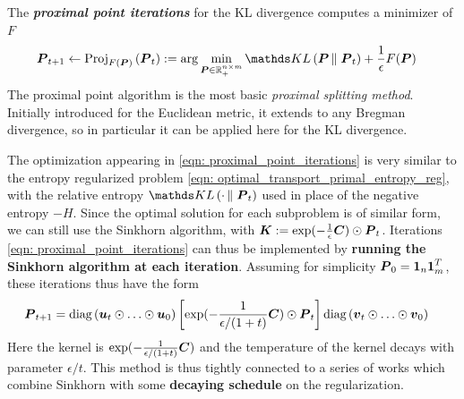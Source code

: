 \documentclass[11pt]{article}
\begin{document}
The \textbf{\emph{proximal point iterations}} for the KL divergence computes a minimizer of $F$
\begin{align}
\mb{P}_{t+1} &\leftarrow \text{Proj}_{F(\mb{P})}\paren{\mb{P}_{t}} :=  \arg\min_{\mb{P} \in \bR_{+}^{n\times m}}\kl{\mb{P}}{\mb{P}_{t}} + \frac{1}{\epsilon}F(\mb{P}) \label{eqn: proximal_point_iterations}
\end{align} The proximal point algorithm is the most basic \emph{proximal splitting method}. Initially introduced for the Euclidean metric, it extends to any Bregman divergence, so in particular it can be applied here for the KL divergence. 

The optimization appearing in \eqref{eqn: proximal_point_iterations} is very similar
to the entropy regularized problem \eqref{eqn: optimal_transport_primal_entropy_reg}, with the relative entropy $\kl{\cdot}{\mb{P}_{t}}$ used in
place of the negative entropy $-H$.  Since the optimal solution for each subproblem is of similar form,  we can still use the Sinkhorn algorithm, with $\boldsymbol{K} := \exp(-\frac{1}{\epsilon}\boldsymbol{C})\odot \boldsymbol{P}_{t}$. Iterations \eqref{eqn: proximal_point_iterations} can thus be implemented by \textbf{running the Sinkhorn algorithm at each iteration}. Assuming for simplicity $\boldsymbol{P}_{0} = \boldsymbol{1}_{n}\boldsymbol{1}_{m}^{T}$, these iterations thus
have the form
\begin{align*}
\boldsymbol{P}_{t+1} &= \text{diag}\left(\boldsymbol{u}_{t}\odot \ldots \odot \boldsymbol{u}_{0}\right)\left[\exp(-\frac{1}{\epsilon/(1+t)}\boldsymbol{C})\odot \boldsymbol{P}_{t}\right]\text{diag}\left(\boldsymbol{v}_{t}\odot \ldots \odot \boldsymbol{v}_{0}\right)
\end{align*} Here the kernel is  $\exp(-\frac{1}{\epsilon/(1+t)}\boldsymbol{C})$ and the temperature of the kernel decays with parameter $\epsilon/t$. This method is thus
tightly connected to a series of works which combine Sinkhorn with some \textbf{decaying schedule} on the regularization.
\end{document}
